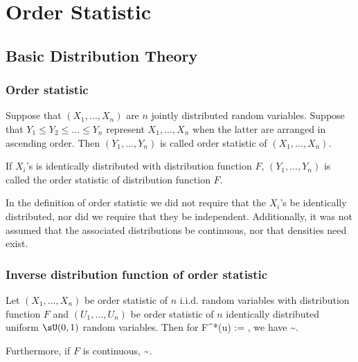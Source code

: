 \chapter{Order Statistic}

\section{Basic Distribution Theory}

\subsection{Order statistic}

\begin{definition}\label{def:order_statistic}
Suppose that $(X_1,\dots,X_n)$ are $n$ jointly distributed random variables. Suppose that $Y_1\leq Y_2\leq \dots \leq Y_n$ represent $X_1,\dots,X_n$ when the latter are arranged in ascending order. Then $(Y_1, \dots, Y_n)$ is called order statistic of $(X_1,\dots,X_n)$. %

If $X_i$'s is identically distributed with distribution function $F$, $(Y_1, \dots, Y_n)$ is called the order statistic of distribution function $F$.
\end{definition}

\begin{remark}
In the definition of order statistic we did not require that the $X_i$'s be identically distributed, nor did we require that they be independent. Additionally, it was not assumed that the associated distributions be continuous, nor that densities need exist.
\end{remark}

\subsection{Inverse distribution function of order statistic}

\begin{lemma}\label{lem:joint_inverse_distribution_function_order_statistic}
Let $(X_{1},\dots, X_{n})$ be order statistic of $n$ i.i.d. random variables with distribution function $F$ and $(U_{1},\dots, U_{n})$ be order statistic of $n$ identically distributed uniform $\sU(0,1)$ random variables. Then for
\be
F^*(u) := \inf{},
\ee
we have
\be
{} \sim {}.
\ee

Furthermore, if $F$ is continuous,
\be
{} \sim {}.
\ee
\end{lemma}

